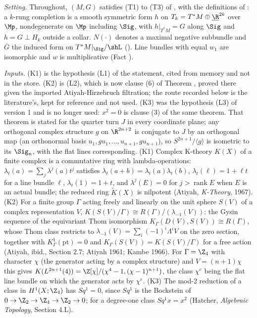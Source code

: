 \emph{Setting.} Throughout, $(M,G)$ satisfies (T1) to (T3) of , with the definitions of : a $k$-rung completion is a smooth symmetric form $h$ on $T_k = T^*M \oplus \underline{\R}^{2k}$ over $\Mp$, nondegenerate on $\Mp$ including $\Sig$, with $h|_{T^*M} = G$ along $\Sig$ and $h = G \perp H_k$ outside a collar. $N(\cdot)$ denotes a maximal negative subbundle and $\overline G$ the induced form on $T^*M|_\Sig/\shL$ (). Line bundles with equal $w_1$ are isomorphic and $w$ is multiplicative (Fact ).

\emph{Inputs.} (K1) is the hypothesis (L1) of the statement, cited from memory and not in the store. (K2) is (L2), which is now clause (6) of Theorem , proved there given the imported Atiyah-Hirzebruch filtration; the route recorded below is the literature's, kept for reference and not used. (K3) was the hypothesis (L3) of version 1 and is no longer used: $x^{2} = 0$ is clause (3) of the same theorem. That theorem is stated for the quarter turn $J$ in every coordinate plane; any orthogonal complex structure $g$ on $\R^{2n+2}$ is conjugate to $J$ by an orthogonal map (an orthonormal basis $u_{1}, g u_{1}, \dots, u_{n+1}, g u_{n+1}$), so $S^{2n+1}/\langle g \rangle$ is isometric to its $\Sig_{n}$, with the flat lines corresponding. (K1) Complex K-theory $K(X)$ of a finite complex is a commutative ring with lambda-operations: $\lambda_t(a) = \sum_{j} \lambda^{j}(a) t^{j}$ satisfies $\lambda_t(a + b) = \lambda_t(a)\lambda_t(b)$, $\lambda_t(\ell) = 1 + \ell t$ for a line bundle $\ell$, $\lambda_t(1) = 1 + t$, and $\lambda^{j}(E) = 0$ for $j > \operatorname{rank} E$ when $E$ is an actual bundle; the reduced ring $\widetilde K(X)$ is nilpotent (Atiyah, \emph{K-Theory}, 1967). (K2) For a finite group $\Gamma$ acting freely and linearly on the unit sphere $S(V)$ of a complex representation $V$, $K(S(V)/\Gamma) \cong R(\Gamma)/(\lambda_{-1}(V))$: the Gysin sequence of the equivariant Thom isomorphism $K_\Gamma(D(V), S(V)) \cong R(\Gamma)$, whose Thom class restricts to $\lambda_{-1}(V) = \sum_i (-1)^{i}\Lambda^{i}V$ on the zero section, together with $K^{1}_\Gamma(\mathrm{pt}) = 0$ and $K_\Gamma(S(V)) = K(S(V)/\Gamma)$ for a free action (Atiyah, ibid., Section 2.7; Atiyah 1961; Kambe 1966). For $\Gamma = \Z_{4}$ with character $\chi$ (the generator acting by a complex structure) and $V = (n+1)\chi$ this gives $K(L^{2n+1}(4)) = \Z[\chi]/(\chi^{4} - 1, (\chi - 1)^{n+1})$, the class $\chi^{e}$ being the flat line bundle on which the generator acts by $\chi^{e}$. (K3) The mod-2 reduction of a class in $H^{1}(X; \Z_{4})$ has $Sq^{1} = 0$, since $Sq^{1}$ is the Bockstein of $0 \to \Z_{2} \to \Z_{4} \to \Z_{2} \to 0$; for a degree-one class $Sq^{1}x = x^{2}$ (Hatcher, \emph{Algebraic Topology}, Section 4.L).

